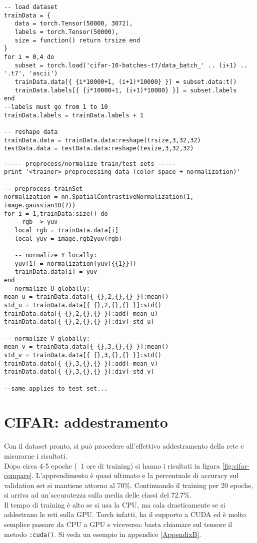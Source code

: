 \begin{lstlisting}[language={[5.2]Lua}]
-- load dataset
trainData = {
   data = torch.Tensor(50000, 3072),
   labels = torch.Tensor(50000),
   size = function() return trsize end
}
for i = 0,4 do
   subset = torch.load('cifar-10-batches-t7/data_batch_' .. (i+1) .. '.t7', 'ascii')
   trainData.data[{ {i*10000+1, (i+1)*10000} }] = subset.data:t()
   trainData.labels[{ {i*10000+1, (i+1)*10000} }] = subset.labels
end
--labels must go from 1 to 10 
trainData.labels = trainData.labels + 1

-- reshape data
trainData.data = trainData.data:reshape(trsize,3,32,32)
testData.data = testData.data:reshape(tesize,3,32,32)

\end{lstlisting}

\begin{lstlisting}[language={[5.2]Lua}]
----- preprocess/normalize train/test sets -----
print '<trainer> preprocessing data (color space + normalization)'

-- preprocess trainSet
normalization = nn.SpatialContrastiveNormalization(1, image.gaussian1D(7))
for i = 1,trainData:size() do
   --rgb -> yuv
   local rgb = trainData.data[i]
   local yuv = image.rgb2yuv(rgb)
   
   -- normalize Y locally:
   yuv[1] = normalization(yuv[{{1}}])
   trainData.data[i] = yuv
end
-- normalize U globally:
mean_u = trainData.data[{ {},2,{},{} }]:mean()
std_u = trainData.data[{ {},2,{},{} }]:std()
trainData.data[{ {},2,{},{} }]:add(-mean_u)
trainData.data[{ {},2,{},{} }]:div(-std_u)

-- normalize V globally:
mean_v = trainData.data[{ {},3,{},{} }]:mean()
std_v = trainData.data[{ {},3,{},{} }]:std()
trainData.data[{ {},3,{},{} }]:add(-mean_v)
trainData.data[{ {},3,{},{} }]:div(-std_v)

--same applies to test set...
\end{lstlisting}

\section{CIFAR: addestramento}
Con il dataset pronto, si può procedere all'effettivo addestramento della rete e misurarne i risultati.\\
Dopo circa 4-5 epoche (~1 ore di training) si hanno i risultati in figura \ref{fig:cifar-compare}. L'apprendimento è quasi ultimato e la percentuale di accuracy sul validation set si mantiene attorno al 70\%. Continuando il training per 20 epoche, si arriva ad un'accuratezza sulla media delle classi del 72.7\%. \\
Il tempo di training è alto se si usa la CPU, ma cala drasticamente se si addestrano le reti sulla GPU. Torch infatti, ha il supporto a CUDA\parencite{cuda} ed è molto semplice passare da CPU a GPU e viceversa: basta chiamare sul tensore il metodo \texttt{:cuda()}. Si veda un esempio in appendice \ref{AppendixB}. 
\\

